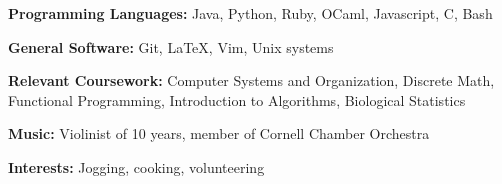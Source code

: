 \documentclass{resume}
\begin{document}
\begin{skills}
    \begin{description}
        \item \textbf{Programming Languages:} Java, Python, Ruby, OCaml, Javascript, C, Bash
        \item \textbf{General Software:} Git, LaTeX, Vim, Unix systems
        \item \textbf{Relevant Coursework:}  
            Computer Systems and Organization,
            Discrete Math,
            Functional Programming,
            Introduction to Algorithms,
            Biological Statistics
    \end{description}
    \begin{description}
        \item \textbf{Music:} Violinist of 10 years, member of Cornell Chamber Orchestra
        \item \textbf{Interests:} Jogging, cooking, volunteering
    \end{description}
\end{skills}
\end{document}
